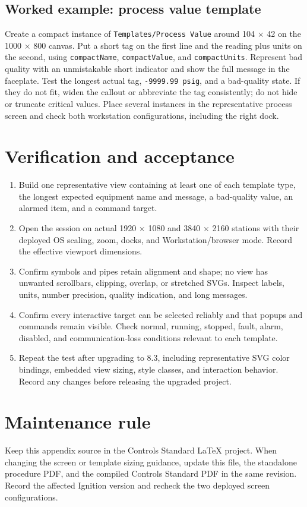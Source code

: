 \subsection{Worked example: process value template}
Create a compact instance of \texttt{Templates/Process Value} around 104 $\times$ 42 on the 1000 $\times$ 800 canvas. Put a short tag on the first line and the reading plus units on the second, using \texttt{compactName}, \texttt{compactValue}, and \texttt{compactUnits}. Represent bad quality with an unmistakable short indicator and show the full message in the faceplate. Test the longest actual tag, \texttt{-9999.99 psig}, and a bad-quality state. If they do not fit, widen the callout or abbreviate the tag consistently; do not hide or truncate critical values. Place several instances in the representative process screen and check both workstation configurations, including the right dock.

\section{Verification and acceptance}
\begin{enumerate}[leftmargin=*,itemsep=3pt]
\item Build one representative view containing at least one of each template type, the longest expected equipment name and message, a bad-quality value, an alarmed item, and a command target.
\item Open the session on actual 1920 $\times$ 1080 and 3840 $\times$ 2160 stations with their deployed OS scaling, zoom, docks, and Workstation/browser mode. Record the effective viewport dimensions.
\item Confirm symbols and pipes retain alignment and shape; no view has unwanted scrollbars, clipping, overlap, or stretched SVGs. Inspect labels, units, number precision, quality indication, and long messages.
\item Confirm every interactive target can be selected reliably and that popups and commands remain visible. Check normal, running, stopped, fault, alarm, disabled, and communication-loss conditions relevant to each template.
\item Repeat the test after upgrading to 8.3, including representative SVG color bindings, embedded view sizing, style classes, and interaction behavior. Record any changes before releasing the upgraded project.
\end{enumerate}

\section{Maintenance rule}
Keep this appendix source in the Controls Standard LaTeX project. When changing the screen or template sizing guidance, update this file, the standalone procedure PDF, and the compiled Controls Standard PDF in the same revision. Record the affected Ignition version and recheck the two deployed screen configurations.

